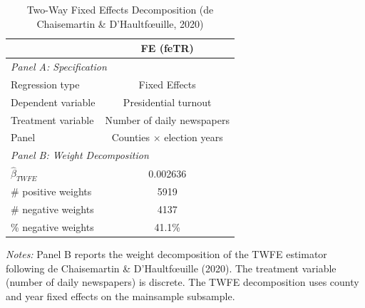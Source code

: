 \begin{table}[htbp]
\centering
\caption{Two-Way Fixed Effects Decomposition (de Chaisemartin \& D'Haultf\oe uille, 2020)}
\label{tab:gentzkow_twfe}
\begin{tabular}{lc}
\toprule
 & FE (feTR) \\
\midrule
\multicolumn{2}{l}{\textit{Panel A: Specification}} \\[3pt]
Regression type & Fixed Effects \\
Dependent variable & Presidential turnout \\
Treatment variable & Number of daily newspapers \\
Panel & Counties $\times$ election years \\[6pt]
\multicolumn{2}{l}{\textit{Panel B: Weight Decomposition}} \\[3pt]
$\hat{\beta}_{TWFE}$ & 0.002636 \\
\# positive weights & 5919 \\
\# negative weights & 4137 \\
\% negative weights &  41.1\% \\
\bottomrule
\end{tabular}

\vspace{6pt}
\begin{minipage}{0.92\textwidth}
\footnotesize
\textit{Notes:} Panel B reports the weight decomposition of the TWFE estimator 
following de Chaisemartin \& D'Haultf\oe uille (2020). 
The treatment variable (number of daily newspapers) is discrete. 
The TWFE decomposition uses county and year fixed effects on the 
mainsample subsample.
\end{minipage}
\end{table}
